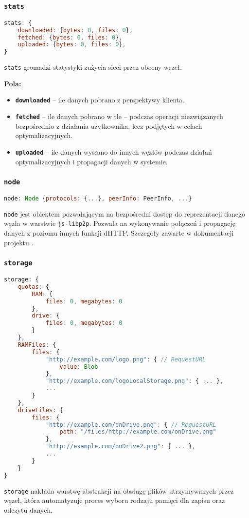 % 

\subsubsection{\texttt{stats}}
\begin{lstlisting}[language=javascript]
stats: {
    downloaded: {bytes: 0, files: 0},
    fetched: {bytes: 0, files: 0},
    uploaded: {bytes: 0, files: 0},
}
\end{lstlisting}
\texttt{stats} gromadzi statystyki zużycia sieci przez obecny węzeł.

\textbf{Pola:}
\begin{itemize}
    \item \textbf{\texttt{downloaded}} -- ile danych pobrano z perspektywy klienta.
    \item \textbf{\texttt{fetched}} -- ile danych pobrano w tle -- podczas operacji niezwiązanych bezpośrednio z działania użytkownika, lecz podjętych w celach optymalizacyjnych.
    \item \textbf{\texttt{uploaded}} -- ile danych wysłano do innych węzłów podczas działań optymalizacyjnych i propagacji danych w systemie.
\end{itemize}

% 

\subsubsection{\texttt{node}}
\begin{lstlisting}[language=javascript]
    node: Node {protocols: {...}, peerInfo: PeerInfo, ...}
\end{lstlisting}
\texttt{node} jest obiektem pozwalającym na bezpośredni dostęp do reprezentacji danego węzła w warstwie \texttt{js-libp2p}. Pozwala na wykonywanie połączeń i propagację danych z poziomu innych funkcji dHTTP. Szczegóły zawarte w dokumentacji projektu \cite{libp2pReadme}.

% 

\subsubsection{\texttt{storage}}
\begin{lstlisting}[language=javascript]
storage: {
    quotas: {
        RAM: {
            files: 0, megabytes: 0
        },
        drive: {
            files: 0, megabytes: 0
        }
    },
    RAMFiles: {
        files: {
            "http://example.com/logo.png": { // RequestURL
                value: Blob
            },
            "http://example.com/logoLocalStorage.png": { ... },
            ...
        }
    },
    driveFiles: {
        files: {
            "http://example.com/onDrive.png": { // RequestURL
                path: "/files/http://example.com/onDrive.png"
            },
            "http://example.com/onDrive2.png": { ... },
            ...
        }
    }
}
\end{lstlisting}
\texttt{storage} nakłada warstwę abstrakcji na obsługę plików utrzymywanych przez węzeł, która automatyzuje proces wyboru rodzaju pamięci dla zapisu oraz odczytu danych.

